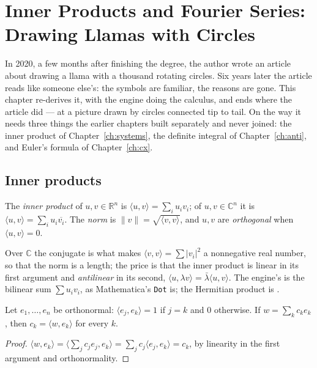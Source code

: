 \chapter{Inner Products and Fourier Series: Drawing Llamas with Circles}\label{ch:fourier}

In 2020, a few months after finishing the degree, the author wrote an article about drawing a
llama with a thousand rotating circles. Six years later the article reads like someone else's:
the symbols are familiar, the reasons are gone. This chapter re-derives it, with the engine doing
the calculus, and ends where the article did --- at a picture drawn by circles connected tip to
tail. On the way it needs three things the earlier chapters built separately and never joined:
the inner product of Chapter~\ref{ch:systems}, the definite integral of
Chapter~\ref{ch:anti}, and Euler's formula of Chapter~\ref{ch:cx}.

\section{Inner products}

\begin{definition}
  The \emph{inner product} of $u, v \in \mathbb{R}^n$ is $\langle u, v\rangle = \sum_i u_i v_i$;
  of $u, v \in \mathbb{C}^n$ it is $\langle u, v\rangle = \sum_i u_i \overline{v_i}$. The
  \emph{norm} is $\|v\| = \sqrt{\langle v, v\rangle}$, and $u, v$ are \emph{orthogonal} when
  $\langle u, v\rangle = 0$.
\end{definition}

Over $\mathbb{C}$ the conjugate is what makes $\langle v, v\rangle = \sum |v_i|^2$ a nonnegative
real number, so that the norm is a length; the price is that the inner product is linear in its
first argument and \emph{antilinear} in its second, $\langle u, \lambda v\rangle =
\bar\lambda\langle u, v\rangle$. The engine's  is the bilinear sum $\sum u_i v_i$, as
Mathematica's \texttt{Dot} is; the Hermitian product is .

\begin{theorem}\label{thm:coeff}
  Let $e_1, \dots, e_n$ be orthonormal: $\langle e_j, e_k\rangle = 1$ if $j = k$ and $0$
  otherwise. If $w = \sum_k c_k e_k$, then $c_k = \langle w, e_k\rangle$ for every $k$.
\end{theorem}
\begin{proof}
  $\langle w, e_k\rangle = \big\langle \sum_j c_j e_j, e_k\big\rangle = \sum_j c_j \langle e_j,
  e_k\rangle = c_k$, by linearity in the first argument and orthonormality.
\end{proof}

